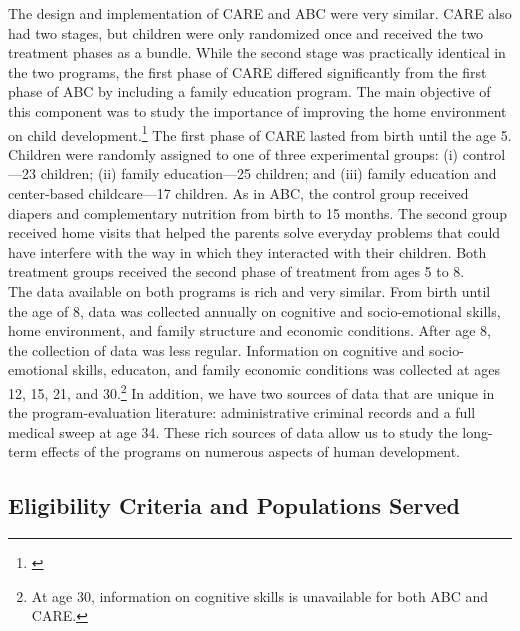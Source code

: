 \noindent The design and implementation of CARE and ABC were very similar. CARE also had two stages, but children were only randomized once and received the two treatment phases as a bundle. While the second stage was practically identical in the two programs, the first phase of CARE differed significantly from the first phase of ABC by including a family education program. The main objective of this component  was to study the importance of improving the home environment on child development.\footnote{\citet{Wasik_Ramey_etal_1990_CD}} The first phase of CARE lasted from birth until the age 5. Children were randomly assigned to one of three experimental groups: (i) control---23 children; (ii) family education---25 children; and (iii) family education and center-based childcare---17 children. As in ABC, the control group received diapers and complementary nutrition from birth to 15 months. The second group received home visits that helped the parents solve everyday problems that could have interfere with the way in which they interacted with their children. Both treatment groups received the second phase of treatment from ages 5 to 8.\\

\noindent The data available on both programs is rich and very similar. From birth until the age of 8, data was collected annually on cognitive and socio-emotional skills, home environment, and family structure and economic conditions. After age 8, the collection of data was less regular. Information on cognitive and socio-emotional skills, educaton, and family economic conditions was collected at ages 12, 15, 21, and 30.\footnote{At age 30, information on cognitive skills is unavailable for both ABC and CARE.} In addition, we have two sources of data that are unique in the program-evaluation literature: administrative criminal records and a full medical sweep at age 34. These rich sources of data allow us to study the long-term effects of the programs on numerous aspects of human development.

\subsection{Eligibility Criteria and Populations Served} \label{section:eligibility}

